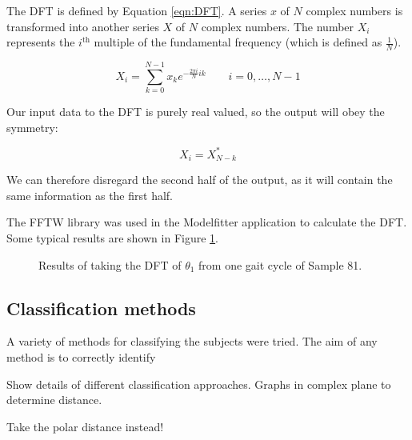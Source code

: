 The DFT is defined by Equation \ref{eqn:DFT}.
A series $x$ of $N$ complex numbers is transformed into another series $X$ of $N$ complex numbers.
The number $X_i$ represents the $i^\text{th}$ multiple of the fundamental frequency (which is defined as $\frac{1}{N}$).

\begin{equation}
	X_i = \sum_{k=0}^{N-1} x_k e^{-\frac{2 \pi i}{N} i k} \quad \quad i = 0, \dots, N-1
	\label{eqn:DFT}
\end{equation}

Our input data to the DFT is purely real valued, so the output will obey the symmetry:

\begin{equation}
	X_i = X_{N-k}^*
\end{equation}

We can therefore disregard the second half of the output, as it will contain the same information as the first half.

The FFTW library \cite{FFTW} was used in the Modelfitter application to calculate the DFT.
Some typical results are shown in Figure \ref{FFTResults}.

\begin{figure}[tb]
	\centering
	\quad
	\caption{Results of taking the DFT of $\theta_1$ from one gait cycle of Sample 81.}
	\label{FFTResults}
\end{figure}


\subsection{Classification methods}

A variety of methods for classifying the subjects were tried.
The aim of any method is to correctly identify 


Show details of different classification approaches.
Graphs in complex plane to determine distance.

Take the polar distance instead!

